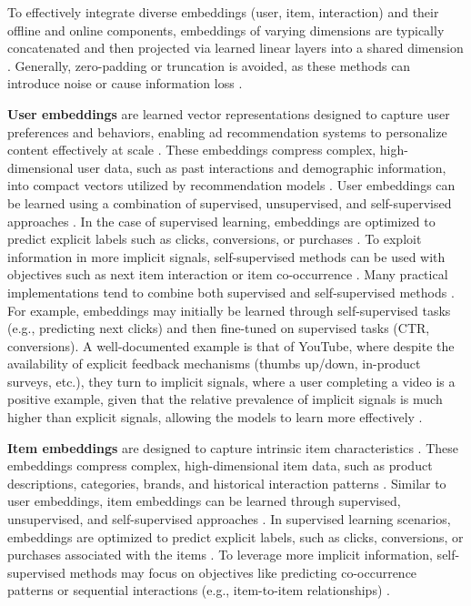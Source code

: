 \documentclass[final]{anthology-ch}         %
\begin{document}
To effectively integrate diverse embeddings (user, item, interaction) and their offline and online components, embeddings of varying dimensions are typically concatenated and then projected via learned linear layers into a shared dimension \cite{pancha2022pinnerformer, grbovic2018real, covington2016deep}. Generally, zero-padding or truncation is avoided, as these methods can introduce noise or cause information loss \cite{xia2023transact}.

\textbf{User embeddings} are learned vector representations designed to capture user preferences and behaviors, enabling ad recommendation systems to personalize content effectively at scale \cite{covington2016deep, he2017neural}. These embeddings compress complex, high-dimensional user data, such as past interactions and demographic information, into compact vectors utilized by recommendation models \cite{covington2016deep, koren2009matrix, naumov2019deep}. User embeddings can be learned using a combination of supervised, unsupervised, and self-supervised approaches \cite{zhao2021dear}.  In the case of supervised learning, embeddings are optimized to predict explicit labels such as clicks, conversions, or purchases \cite{covington2016deep, Zhou2018}. To exploit information in more implicit signals, self-supervised methods can be used with objectives such as next item interaction or item co-occurrence \cite{yuan2020unbiased, mikolov2013distributed}. Many practical implementations tend to combine both supervised and self-supervised methods \cite{zhao2021dear, xia2023transact}. For example, embeddings may initially be learned through self-supervised tasks (e.g., predicting next clicks) and then fine-tuned on supervised tasks (CTR, conversions). A well-documented example is that of YouTube, where despite the availability of explicit feedback mechanisms (thumbs up/down, in-product surveys, etc.), they turn to implicit signals, where a user completing a video is a positive example, given that the relative prevalence of implicit signals is much higher than explicit signals, allowing the models to learn more effectively \cite{covington2016deep}.

\textbf{Item embeddings} are designed to capture intrinsic item characteristics \cite{koren2009matrix}. These embeddings compress complex, high-dimensional item data, such as product descriptions, categories, brands, and historical interaction patterns \cite{koren2009matrix, cheng2016wide}. Similar to user embeddings, item embeddings can be learned through supervised, unsupervised, and self-supervised approaches \cite{barkan2016item2vec, zhao2023embedding}. In supervised learning scenarios, embeddings are optimized to predict explicit labels, such as clicks, conversions, or purchases associated with the items \cite{covington2016deep, naumov2019deep}. To leverage more implicit information, self-supervised methods may focus on objectives like predicting co-occurrence patterns or sequential interactions (e.g., item-to-item relationships) \cite{barkan2016item2vec, sun2019bert4rec}. 
\end{document}
